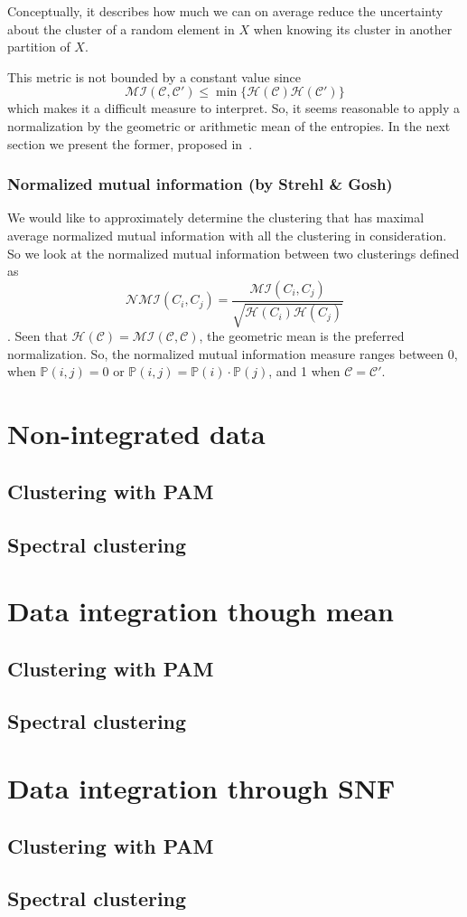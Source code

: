 Conceptually, it describes how much we can on average reduce the uncertainty about the cluster of a random element in $X$ when knowing its cluster in another partition of $X$.

This metric is not bounded by a constant value since
\begin{equation*}
    \mathcal{MI}(\mathcal{C},\mathcal{C}')\leq\min\{\mathcal{H}(\mathcal{C})\mathcal{H}(\mathcal{C}')\}
\end{equation*}
which makes it a difficult measure to interpret. So, it seems reasonable to apply a normalization by the geometric or arithmetic mean of the entropies. In the next section we present the former, proposed in~\cite{StrehlA2003Ce-A}.

\subsubsection{Normalized mutual information (by Strehl \& Gosh)}
We would like to approximately determine the clustering that has maximal average normalized mutual information with all the clustering in consideration. So we look at the normalized mutual information between two clusterings defined as
\begin{equation*}
    \mathcal{NMI}(C_i, C_j) = \frac{\mathcal{MI}(C_i, C_j)}{\sqrt{\mathcal{H}(C_i) \mathcal{H}(C_j)}}
\end{equation*}.
Seen that $\mathcal{H}(\mathcal{C})=\mathcal{MI}(\mathcal{C},\mathcal{C})$, the geometric mean is the preferred normalization. So, the normalized mutual information measure ranges between 0, when $\mathbb{P}(i,j)=0$ or $\mathbb{P}(i,j)=\mathbb{P}(i)\cdot\mathbb{P}(j)$, and 1 when $\mathcal{C}=\mathcal{C}'$.
\section{Non-integrated data}\label{results_nonIntegrated}
\subsection{Clustering with PAM}
\subsection{Spectral clustering}

\section{Data integration though mean}\label{results_mean}
\subsection{Clustering with PAM}
\subsection{Spectral clustering}

\section{Data integration through SNF}\label{results_SNF}
\subsection{Clustering with PAM}
\subsection{Spectral clustering}